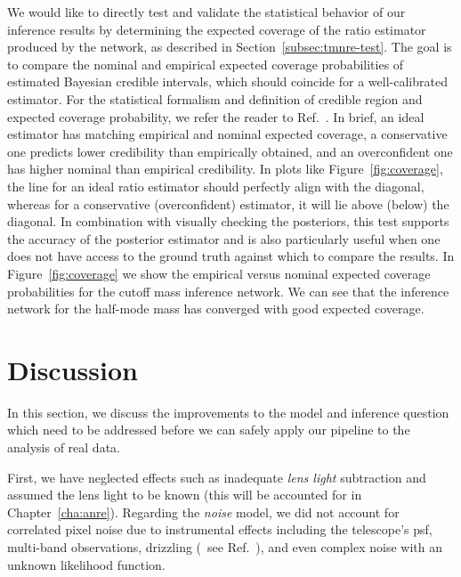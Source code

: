 We would like to directly test and validate the statistical behavior of our inference results by determining the expected coverage of the ratio estimator produced by the network, as described in Section~\ref{subsec:tmnre-test}. The goal is to compare the nominal and empirical expected coverage probabilities of estimated Bayesian credible intervals, which should coincide for a well-calibrated estimator. For the statistical formalism and definition of credible region and expected coverage probability, we refer the reader to Ref.~\cite{Hermans:2021rqv}. In brief, an ideal estimator has matching empirical and nominal expected coverage, a conservative one predicts lower credibility than empirically obtained, and an overconfident one has higher nominal than empirical credibility. In plots like Figure~\ref{fig:coverage}, the line for an ideal ratio estimator should perfectly align with the diagonal, whereas for a conservative (overconfident) estimator, it will lie above (below) the diagonal.
In combination with visually checking the posteriors, this test supports the accuracy of the posterior estimator and is also particularly useful when one does not have access to the ground truth against which to compare the results.
In Figure~\ref{fig:coverage} we show the empirical versus nominal expected coverage probabilities for the cutoff mass inference network. We can see that the inference network for the half-mode mass has converged with good expected coverage. 


\section{Discussion}\label{sec:sl-discussion}

In this section, we discuss the improvements to the model and inference question which need to be addressed before we can safely apply our pipeline to the analysis of real data. 

First, we have neglected effects such as inadequate \emph{lens light} subtraction and assumed the lens light to be known (this will be accounted for in Chapter~\ref{cha:anre}). Regarding the \emph{noise} model, we did not account for correlated pixel noise due to instrumental effects including the telescope's \gls*{psf}, multi-band observations, drizzling  (\eg~see Ref.~\cite{Wagner-Carena:2022mrn}), and even complex noise with an unknown likelihood function.

